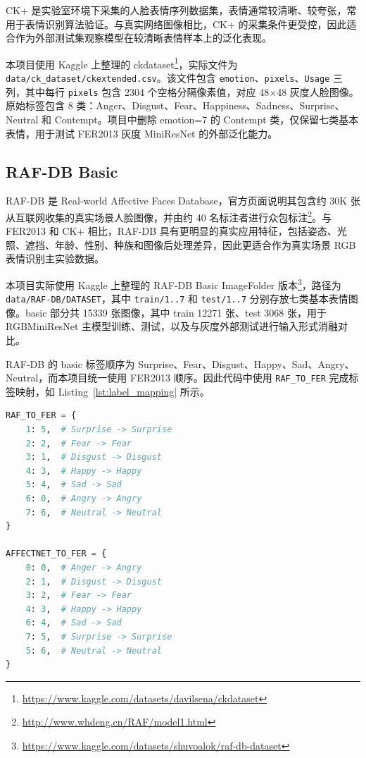 \documentclass[UTF8,a4paper,12pt]{ctexart}
\newcommand{\code}[1]{\texttt{#1}}
\newcommand{\sourceurl}[1]{\footnote{\url{#1}}}
\begin{document}
CK+ 是实验室环境下采集的人脸表情序列数据集，表情通常较清晰、较夸张，常用于表情识别算法验证。与真实网络图像相比，CK+ 的采集条件更受控，因此适合作为外部测试集观察模型在较清晰表情样本上的泛化表现。

本项目使用 Kaggle 上整理的 ckdataset\sourceurl{https://www.kaggle.com/datasets/davilsena/ckdataset}，实际文件为 \code{data/ck\_dataset/ckextended.csv}。该文件包含 \code{emotion}、\code{pixels}、\code{Usage} 三列，其中每行 \code{pixels} 包含 2304 个空格分隔像素值，对应 48$\times$48 灰度人脸图像。原始标签包含 8 类：Anger、Disgust、Fear、Happiness、Sadness、Surprise、Neutral 和 Contempt。项目中删除 emotion=7 的 Contempt 类，仅保留七类基本表情，用于测试 FER2013 灰度 MiniResNet 的外部泛化能力。

\subsection{RAF-DB Basic}

RAF-DB 是 Real-world Affective Faces Database，官方页面说明其包含约 30K 张从互联网收集的真实场景人脸图像，并由约 40 名标注者进行众包标注\sourceurl{http://www.whdeng.cn/RAF/model1.html}。与 FER2013 和 CK+ 相比，RAF-DB 具有更明显的真实应用特征，包括姿态、光照、遮挡、年龄、性别、种族和图像后处理差异，因此更适合作为真实场景 RGB 表情识别主实验数据。

本项目实际使用 Kaggle 上整理的 RAF-DB Basic ImageFolder 版本\sourceurl{https://www.kaggle.com/datasets/shuvoalok/raf-db-dataset}，路径为 \code{data/RAF-DB/DATASET}，其中 \code{train/1..7} 和 \code{test/1..7} 分别存放七类基本表情图像。basic 部分共 15339 张图像，其中 train 12271 张、test 3068 张，用于 RGBMiniResNet 主模型训练、测试，以及与灰度外部测试进行输入形式消融对比。

RAF-DB 的 basic 标签顺序为 Surprise、Fear、Disgust、Happy、Sad、Angry、Neutral，而本项目统一使用 FER2013 顺序。因此代码中使用 \code{RAF\_TO\_FER} 完成标签映射，如 Listing~\ref{lst:label_mapping} 所示。

\begin{lstlisting}[language=Python, caption={RAF-DB 与 AffectNet 标签映射核心代码}, label={lst:label_mapping}]
RAF_TO_FER = {
    1: 5,  # Surprise -> Surprise
    2: 2,  # Fear -> Fear
    3: 1,  # Disgust -> Disgust
    4: 3,  # Happy -> Happy
    5: 4,  # Sad -> Sad
    6: 0,  # Angry -> Angry
    7: 6,  # Neutral -> Neutral
}

AFFECTNET_TO_FER = {
    0: 0,  # Anger -> Angry
    2: 1,  # Disgust -> Disgust
    3: 2,  # Fear -> Fear
    4: 3,  # Happy -> Happy
    6: 4,  # Sad -> Sad
    7: 5,  # Surprise -> Surprise
    5: 6,  # Neutral -> Neutral
}
\end{lstlisting}
\end{document}
